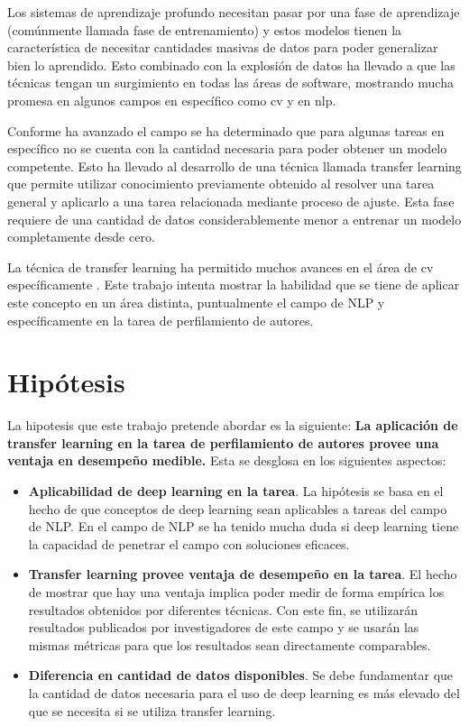 Los sistemas de aprendizaje profundo necesitan pasar por una fase de aprendizaje (comúnmente llamada fase de \gls{entrenamiento}) y estos modelos tienen la característica de necesitar cantidades masivas de datos para poder generalizar bien lo aprendido. Esto combinado con la explosión de datos ha llevado a que las técnicas tengan un surgimiento en todas las áreas de software, mostrando mucha promesa en algunos campos en específico como \gls{cv} \parencite{hoo2016deep} y en \gls{nlp}.

Conforme ha avanzado el campo se ha determinado que para algunas tareas en específico no se cuenta con la cantidad necesaria para poder obtener un modelo competente. Esto ha llevado al desarrollo de una técnica llamada transfer learning que permite utilizar conocimiento previamente obtenido al resolver una tarea general y aplicarlo a una tarea relacionada mediante proceso de ajuste. Esta fase requiere de una cantidad de datos considerablemente menor a entrenar un modelo completamente desde cero.

La técnica de transfer learning ha permitido muchos avances en el área de \gls{cv} específicamente \parencite{hoo2016deep}. Este trabajo intenta mostrar la habilidad que se tiene de aplicar este concepto en un área distinta, puntualmente el campo de NLP y específicamente en la tarea de \gls{perfilamiento de autores}.

\section{Hipótesis}

La hipotesis que este trabajo pretende abordar es la siguiente: \textbf{La aplicación de transfer learning en la tarea de perfilamiento de autores provee una ventaja en desempeño medible.} Esta se desglosa en los siguientes aspectos:

\begin{itemize}
\item \textbf{Aplicabilidad de deep learning en la tarea}. La hipótesis se basa en el hecho de que conceptos de deep learning sean aplicables a tareas del campo de NLP. En el campo de NLP se ha tenido mucha duda si deep learning tiene la capacidad de penetrar el campo con soluciones eficaces.

\item \textbf{Transfer learning provee ventaja de desempeño en la tarea}. El hecho de mostrar que hay una ventaja implica poder medir de forma empírica los resultados obtenidos por diferentes técnicas. Con este fin, se utilizarán resultados publicados por investigadores de este campo y se usarán las mismas métricas para que los resultados sean directamente comparables.

\item \textbf{Diferencia en cantidad de datos disponibles}. Se debe fundamentar que la cantidad de datos necesaria para el uso de deep learning es más elevado del que se necesita si se utiliza transfer learning.
\end{itemize}

